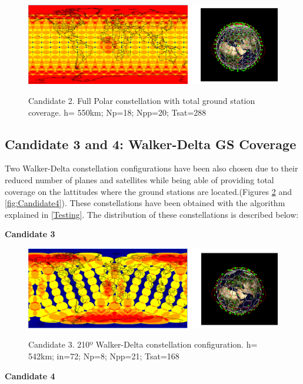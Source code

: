 \begin{figure}%
	\centering
	\includegraphics[width=1\textwidth]{Candidate2.png}\\
	\caption{Candidate 2. Full Polar constellation with total ground station coverage.
			 h= 550km; Np=18; Npp=20; Tsat=288 }
	\label{fig:Candidate2}
\end{figure}


\subsection{Candidate 3 and 4: Walker-Delta GS Coverage}

Two Walker-Delta constellation configurations have been also chosen due to their reduced number of planes and satellites while being able of providing total coverage on the lattitudes where the ground stations are located.(Figures \ref{fig:Candidate3} and \ref{fig:Candidate4}).
These constellations have been obtained with the algorithm explained in \ref{Testing}. The distribution of these constellations is described below:

\textbf{Candidate 3}\\

\begin{figure}%
	\centering
	\includegraphics[width=1\textwidth]{Candidate3.png}\\
	\caption{Candidate 3. 210º Walker-Delta constellation configuration.
			 h= 542km; in=72; Np=8; Npp=21; Tsat=168 }
	\label{fig:Candidate3}
\end{figure}


\textbf{Candidate 4}\\  

